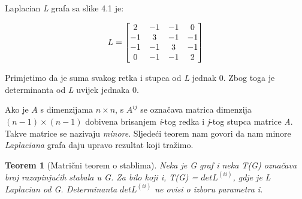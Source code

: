 \documentclass[times, utf8, zavrsni]{fer}
\newtheorem{theorem}{Teorem}[section]
\begin{document}
Laplacian \textit{L} grafa sa slike 4.1 je:

\[
\centering
L = 
\begin{bmatrix}
	2 & -1 & -1 & 0 \\
	-1 & 3 & -1 & -1 \\
	-1 & -1 & 3 & -1 \\
	0 & -1 & -1 & 2
\end{bmatrix}
\]

Primjetimo da je suma svakog retka i stupca od \textit{L} jednak 0. Zbog toga je determinanta od \textit{L} uvijek jednaka 0.

Ako je $A$ s dimenzijama $n \times n$, s $A^{ij}$ se označava matrica dimenzija $(n - 1) \times (n - 1)$ dobivena brisanjem \textit{i}-tog redka i \textit{j}-tog stupca matrice \textit{A}. Takve matrice se nazivaju \textit{minore}. Sljedeći teorem nam govori da nam minore \textit{Laplaciana} grafa daju upravo rezultat koji tražimo.

\begin{theorem}[Matrični teorem o stablima]
Neka je G graf i neka T(G) označava broj razapinjućih stabala u G. Za bilo koji i, T(G) = $det L^{(ii)}$, gdje je L Laplacian od G. Determinanta $det L^{(ii)}$ ne ovisi o izboru parametra i.
\end{theorem}
\end{document}
